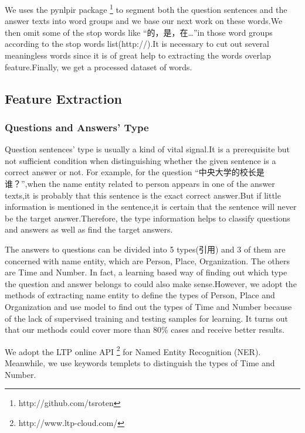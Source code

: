 \documentclass{llncs}
\begin{document}
We uses the pynlpir package \footnote{http://github.com/tsroten} to segment both the question sentences and the answer texts into word groups and we base our next work on these words.We then omit some of the stop words like “的，是，在…”in those word groups according to the stop words list(http://).It is necessary to cut out several meaningless words since it is of great help to extracting the words overlap feature.Finally, we get a processed dataset of words.



\subsection{Feature Extraction}
\label{sec:feature}

\subsubsection{Questions and Answers’ Type}
Question sentences’ type is usually a kind of vital signal.It is a prerequisite but not sufficient condition when distinguishing whether the given sentence is a correct answer or not. For example, for the question “中央大学的校长是谁？”,when the name entity related to person appears in one of the answer texts,it is probably that this sentence is the exact correct answer.But if little information is mentioned in the sentence,it is certain that the sentence will never be the target answer.Therefore, the type information helps to classify questions and answers as well as find the target answers. 

The answers to questions can be divided into 5 types(引用) and 3 of them are concerned with name entity, which are Person, Place, Organization. The others are Time and Number. In fact, a learning based way of finding out which type the question and answer belongs to could also make sense.However, we adopt the methods of extracting name entity to define the types of Person, Place and Organization and use model to find out the types of Time and Number because of the lack of supervised training and testing samples for learning. It turns out that our methods could cover more than 80\% cases and receive better results.

We adopt the LTP online API \footnote{http://www.ltp-cloud.com/} for Named Entity Recognition (NER). Meanwhile, we use keywords templets to distinguish the types of Time and Number.
\end{document}
